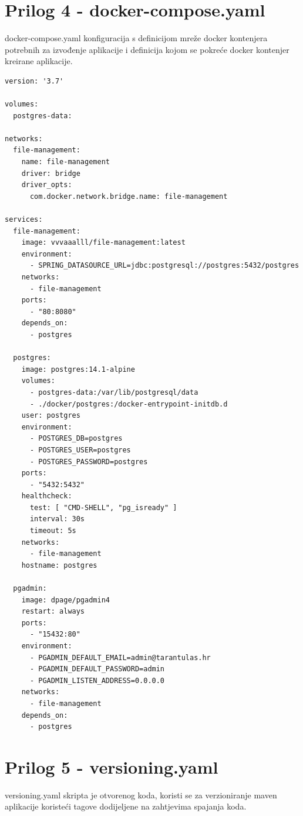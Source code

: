 \documentclass[a4paper,12pt,oneside]{article}
\begin{document}
\section*{Prilog 4 - docker-compose.yaml}
\label{prilog 4}
docker-compose.yaml konfiguracija s definicijom mreže docker kontenjera potrebnih za izvođenje aplikacije i definicija kojom se pokreće docker kontenjer kreirane aplikacije.
\begin{lstlisting}
version: '3.7'

volumes:
  postgres-data:

networks:
  file-management:
    name: file-management
    driver: bridge
    driver_opts:
      com.docker.network.bridge.name: file-management

services:
  file-management:
    image: vvvaaalll/file-management:latest
    environment:
      - SPRING_DATASOURCE_URL=jdbc:postgresql://postgres:5432/postgres
    networks:
      - file-management
    ports:
      - "80:8080"
    depends_on:
      - postgres

  postgres:
    image: postgres:14.1-alpine
    volumes:
      - postgres-data:/var/lib/postgresql/data
      - ./docker/postgres:/docker-entrypoint-initdb.d
    user: postgres
    environment:
      - POSTGRES_DB=postgres
      - POSTGRES_USER=postgres
      - POSTGRES_PASSWORD=postgres
    ports:
      - "5432:5432"
    healthcheck:
      test: [ "CMD-SHELL", "pg_isready" ]
      interval: 30s
      timeout: 5s
    networks:
      - file-management
    hostname: postgres

  pgadmin:
    image: dpage/pgadmin4
    restart: always
    ports:
      - "15432:80"
    environment:
      - PGADMIN_DEFAULT_EMAIL=admin@tarantulas.hr
      - PGADMIN_DEFAULT_PASSWORD=admin
      - PGADMIN_LISTEN_ADDRESS=0.0.0.0
    networks:
      - file-management
    depends_on:
      - postgres

\end{lstlisting}

\newpage
\section*{Prilog 5 - versioning.yaml}
\label{prilog 5}
versioning.yaml skripta je otvorenog koda, koristi se za verzioniranje maven aplikacije koristeći tagove dodijeljene na zahtjevima spajanja koda.
\end{document}
